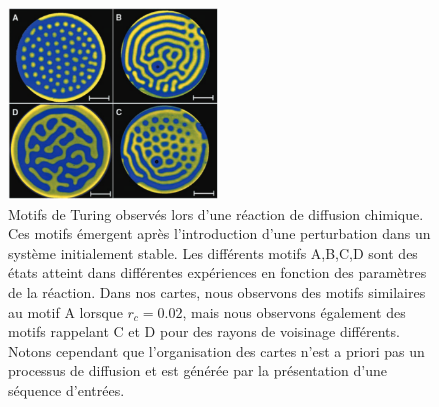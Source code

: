 \documentclass[../main]{subfiles}
\begin{document}
\begin{figure}
\centering\includegraphics[width=0.5\textwidth]{turing_pattern_chem.pdf}
\caption{Motifs de Turing observés lors d'une réaction de diffusion chimique. Ces motifs émergent après l'introduction d'une perturbation dans un système initialement stable. Les différents motifs A,B,C,D sont des états atteint dans différentes expériences en fonction des paramètres de la réaction. Dans nos cartes, nous observons des motifs similaires au motif A lorsque $r_c = 0.02$, mais nous observons également des motifs rappelant C et D pour des rayons de voisinage différents. Notons cependant que l'organisation des cartes n'est a priori pas un processus de diffusion et est générée par la présentation d'une séquence d'entrées.  \label{fig:turing}}
\end{figure}




\ifSubfilesClassLoaded{
    \printbibliography
}{}
\end{document}
